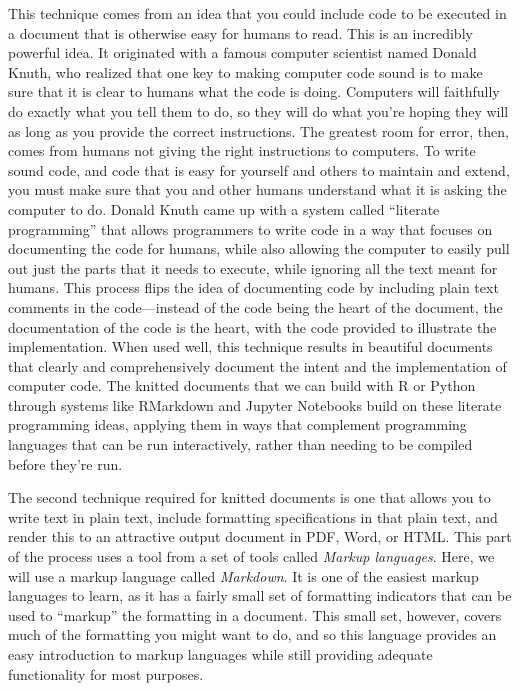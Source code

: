 \documentclass[]{tufte-book}
\begin{document}
This technique comes from an idea that you could include code to be executed in
a document that is otherwise easy for humans to read. This is an incredibly
powerful idea. It originated with a famous computer scientist named Donald
Knuth, who realized that one key to making computer code sound is to make sure
that it is clear to humans what the code is doing. Computers will faithfully do
exactly what you tell them to do, so they will do what you're hoping they will
as long as you provide the correct instructions. The greatest room for error,
then, comes from humans not giving the right instructions to computers. To
write sound code, and code that is easy for yourself and others to maintain and
extend, you must make sure that you and other humans understand what it is
asking the computer to do. Donald Knuth came up with a system called ``literate
programming'' that allows programmers to write code in a way that focuses on
documenting the code for humans, while also allowing the computer to easily
pull out just the parts that it needs to execute, while ignoring all the text
meant for humans. This process flips the idea of documenting code by including
plain text comments in the code---instead of the code being the heart of the
document, the documentation of the code is the heart, with the code provided
to illustrate the implementation. When used well, this technique results in
beautiful documents that clearly and comprehensively document the intent and
the implementation of computer code. The knitted documents that we can build
with R or Python through systems like RMarkdown and Jupyter Notebooks build
on these literate programming ideas, applying them in ways that complement
programming languages that can be run interactively, rather than needing to
be compiled before they're run.

The second technique required for knitted documents is one that allows you to
write text in plain text, include formatting specifications in that plain text,
and render this to an attractive output document in PDF, Word, or HTML. This
part of the process uses a tool from a set of tools called \emph{Markup languages}.
Here, we will use a markup language called \emph{Markdown}. It is one of the easiest
markup languages to learn, as it has a fairly small set of formatting indicators
that can be used to ``markup'' the formatting in a document. This small set,
however, covers much of the formatting you might want to do, and so this
language provides an easy introduction to markup languages while still providing
adequate functionality for most purposes.
\end{document}
